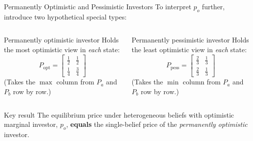 \documentclass[aspectratio=169]{beamer}
\newcommand{\Pa}{P_a}
\newcommand{\Pb}{P_b}
\begin{document}
\begin{frame}{Permanently Optimistic and Pessimistic Investors}
  To interpret $p_o$ further, introduce two hypothetical special types:

  \bigskip
  \begin{columns}
    \begin{block}{Permanently optimistic investor}
      Holds the most optimistic view in \emph{each} state:
      \[
        P_{\mathrm{opt}} =
        \begin{bmatrix}
          \tfrac{1}{2} & \tfrac{1}{2} \\[4pt]
          \tfrac{1}{4} & \tfrac{3}{4}
        \end{bmatrix}
      \]
      (Takes the $\max$ column from $\Pa$ and $\Pb$ row by row.)
    \end{block}

    \begin{block}{Permanently pessimistic investor}
      Holds the least optimistic view in \emph{each} state:
      \[
        P_{\mathrm{pess}} =
        \begin{bmatrix}
          \tfrac{2}{3} & \tfrac{1}{3} \\[4pt]
          \tfrac{2}{3} & \tfrac{1}{3}
        \end{bmatrix}
      \]
      (Takes the $\min$ column from $\Pa$ and $\Pb$ row by row.)
    \end{block}
  \end{columns}

  \bigskip
  \begin{alertblock}{Key result}
    The equilibrium price under heterogeneous beliefs with optimistic marginal
    investor, $p_o$, \textbf{equals} the single-belief price of the
    \emph{permanently optimistic} investor.
  \end{alertblock}
\end{frame}
\end{document}

